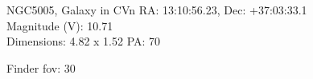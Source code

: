 \begin{block}{NGC5005, Galaxy in CVn}
    RA: 13:10:56.23, Dec: +37:03:33.1 \\ 
    Magnitude (V): 10.71 \\ 
    Dimensions: 4.82 x 1.52 PA: 70 

    Finder fov: 30 
\end{block}